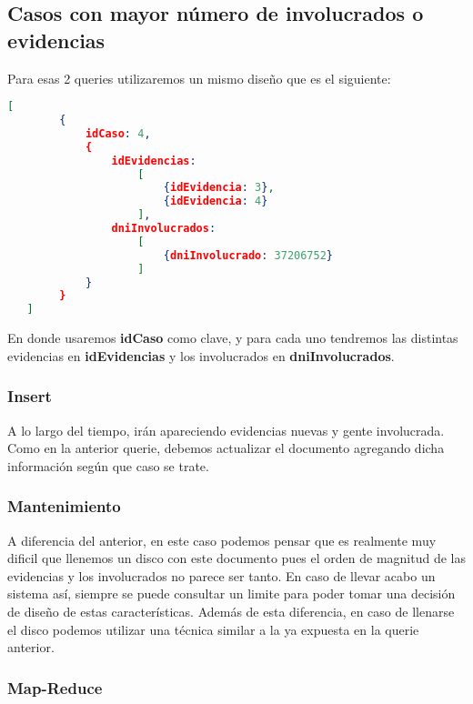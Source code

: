 \documentclass[11pt, a4paper]{article}
\begin{document}
\subsection{Casos con mayor n\'umero de involucrados o evidencias}

Para esas 2 queries utilizaremos un mismo dise\~no que es el siguiente:

\begin{lstlisting}[language=json]
   [
   		{
   			idCaso: 4,
	   		{
	   			idEvidencias: 
	   				[	
	   					{idEvidencia: 3},
	   					{idEvidencia: 4}
	   				],
	   			dniInvolucrados:
	   				[
	   					{dniInvolucrado: 37206752}
	   				]
	   		}
	   	}
   ]
\end{lstlisting}

En donde usaremos \textbf{idCaso} como clave, y para cada uno tendremos las distintas evidencias en \textbf{idEvidencias} y los involucrados en \textbf{dniInvolucrados}.

\subsubsection{Insert}

A lo largo del tiempo, ir\'an apareciendo evidencias nuevas y gente involucrada. Como en la anterior querie, debemos actualizar el documento agregando dicha informaci\'on seg\'un que caso se trate.

\subsubsection{Mantenimiento}

A diferencia del anterior, en este caso podemos pensar que es realmente muy dificil que llenemos un disco con este documento pues el orden de magnitud de las evidencias y los involucrados no parece ser tanto. En caso de llevar acabo un sistema as\'i, siempre se puede consultar un limite para poder tomar una decisi\'on de dise\~no de estas caracter\'isticas. Adem\'as de esta diferencia, en caso de llenarse el disco podemos utilizar una t\'ecnica similar a la ya expuesta en la querie anterior.

\subsubsection{Map-Reduce}
\end{document}
